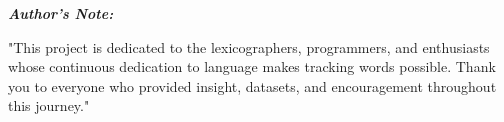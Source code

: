 \thispagestyle{empty}
\vspace*{\fill}
\begin{center}
    \begin{minipage}{0.8\linewidth}
        \centering
        \itshape
        \textbf{\large Author's Note:}\par\vspace{1.5em}
        "This project is dedicated to the lexicographers, programmers, and enthusiasts whose continuous dedication to language makes tracking words possible. Thank you to everyone who provided insight, datasets, and encouragement throughout this journey."
    \end{minipage}
\end{center}
\vspace*{\fill}

